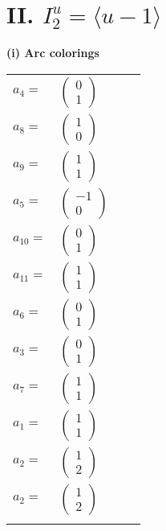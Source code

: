 \documentclass[1p]{elsarticle_modified}
\theoremstyle{definition}
\begin{document}
\centering \section*{II. $I^u_{2}= \langle u-1 \rangle$}
\flushleft \textbf{(i) Arc colorings}\\
\begin{tabular}{m{7pt} m{180pt} m{7pt} m{180pt} }
\flushright $a_{4}=$&$\begin{pmatrix}0\\1\end{pmatrix}$ \\
\flushright $a_{8}=$&$\begin{pmatrix}1\\0\end{pmatrix}$ \\
\flushright $a_{9}=$&$\begin{pmatrix}1\\1\end{pmatrix}$ \\
\flushright $a_{5}=$&$\begin{pmatrix}-1\\0\end{pmatrix}$ \\
\flushright $a_{10}=$&$\begin{pmatrix}0\\1\end{pmatrix}$ \\
\flushright $a_{11}=$&$\begin{pmatrix}1\\1\end{pmatrix}$ \\
\flushright $a_{6}=$&$\begin{pmatrix}0\\1\end{pmatrix}$ \\
\flushright $a_{3}=$&$\begin{pmatrix}0\\1\end{pmatrix}$ \\
\flushright $a_{7}=$&$\begin{pmatrix}1\\1\end{pmatrix}$ \\
\flushright $a_{1}=$&$\begin{pmatrix}1\\1\end{pmatrix}$ \\
\flushright $a_{2}=$&$\begin{pmatrix}1\\2\end{pmatrix}$\\ \flushright $a_{2}=$&$\begin{pmatrix}1\\2\end{pmatrix}$\\&\end{tabular}
\end{document}
